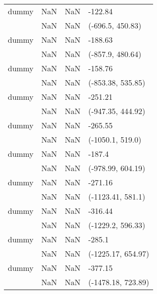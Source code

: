 \begin{tabular}{llll}
dummy           &                     NaN &                    NaN &               -122.84 \\
                &                     NaN &                    NaN &      (-696.5, 450.83) \\
dummy           &                     NaN &                    NaN &               -188.63 \\
                &                     NaN &                    NaN &      (-857.9, 480.64) \\
dummy           &                     NaN &                    NaN &               -158.76 \\
                &                     NaN &                    NaN &     (-853.38, 535.85) \\
dummy           &                     NaN &                    NaN &               -251.21 \\
                &                     NaN &                    NaN &     (-947.35, 444.92) \\
dummy           &                     NaN &                    NaN &               -265.55 \\
                &                     NaN &                    NaN &      (-1050.1, 519.0) \\
dummy           &                     NaN &                    NaN &                -187.4 \\
                &                     NaN &                    NaN &     (-978.99, 604.19) \\
dummy           &                     NaN &                    NaN &               -271.16 \\
                &                     NaN &                    NaN &     (-1123.41, 581.1) \\
dummy           &                     NaN &                    NaN &               -316.44 \\
                &                     NaN &                    NaN &     (-1229.2, 596.33) \\
dummy           &                     NaN &                    NaN &                -285.1 \\
                &                     NaN &                    NaN &    (-1225.17, 654.97) \\
dummy           &                     NaN &                    NaN &               -377.15 \\
                &                     NaN &                    NaN &    (-1478.18, 723.89) \\

\end{tabular}
